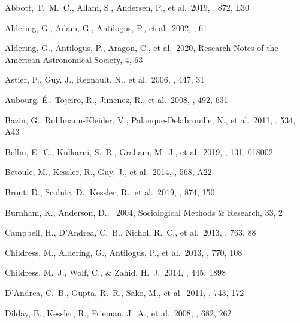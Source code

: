 \documentclass[]{aa}
\begin{document}

\begin{thebibliography}{} 

 Abbott, T.~M.~C., Allam, S.,
Andersen, P., et al.\ 2019, \apjl, 872, L30

 Aldering, G., Adam, G., Antilogus,
P., et al.\ 2002, \procspie, 61

 Aldering, G., Antilogus, P.,
Aragon, C., et al.\ 2020, Research Notes of the American Astronomical Society,
4, 63

 Astier, P., Guy, J., Regnault, N., et
al.\ 2006, \aap, 447, 31

 Aubourg, {\'E}., Tojeiro, R.,
Jimenez, R., et al.\ 2008, \aap, 492, 631 


 Bazin, G., Ruhlmann-Kleider, V.,
Palanque-Delabrouille, N., et al.\ 2011, \aap, 534, A43

 Bellm, E.~C., Kulkarni, S.~R., Graham,
M.~J., et al.\ 2019, \pasp, 131, 018002

 Betoule, M., Kessler, R., Guy, J.,
et al.\ 2014, \aap, 568, A22

 Brout, D., Scolnic, D., Kessler, R., et
al.\ 2019, \apj, 874, 150

 Burnham, K., Anderson, D., \
2004, Sociological Methods \& Research, 33, 2


 Campbell, H., D'Andrea, C.~B.,
Nichol, R.~C., et al.\ 2013, \apj, 763, 88

 Childress, M., Aldering, G.,
Antilogus, P., et al.\ 2013, \apj, 770, 108

 Childress, M.~J., Wolf, C., \&
Zahid, H.~J.\ 2014, \mnras, 445, 1898


 D'Andrea, C.~B., Gupta, R.~R.,
Sako, M., et al.\ 2011, \apj, 743, 172

 Dilday, B., Kessler, R., Frieman,
J.~A., et al.\ 2008, \apj, 682, 262


\end{thebibliography}
\end{document}
